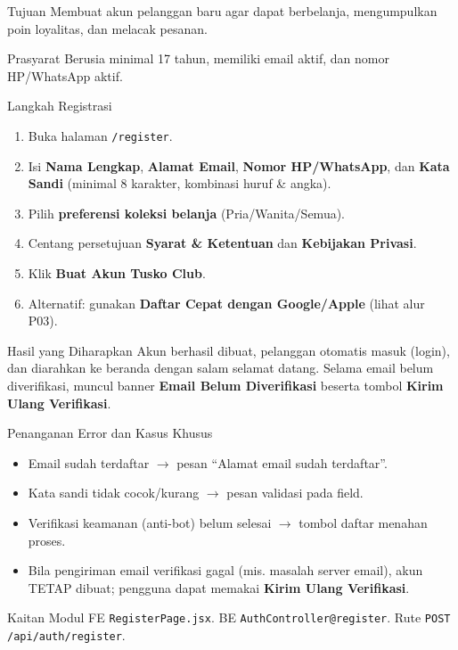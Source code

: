 
\begin{flowsection}{Tujuan}
Membuat akun pelanggan baru agar dapat berbelanja, mengumpulkan poin loyalitas,
dan melacak pesanan.
\end{flowsection}

\begin{flowsection}{Prasyarat}
Berusia minimal 17 tahun, memiliki email aktif, dan nomor HP/WhatsApp aktif.
\end{flowsection}

\begin{flowsection}{Langkah Registrasi}
\begin{enumerate}
  \item Buka halaman \texttt{/register}.
  \item Isi \textbf{Nama Lengkap}, \textbf{Alamat Email}, \textbf{Nomor HP/WhatsApp},
        dan \textbf{Kata Sandi} (minimal 8 karakter, kombinasi huruf \& angka).
  \item Pilih \textbf{preferensi koleksi belanja} (Pria/Wanita/Semua).
  \item Centang persetujuan \textbf{Syarat \& Ketentuan} dan \textbf{Kebijakan Privasi}.
  \item Klik \textbf{Buat Akun Tusko Club}.
  \item Alternatif: gunakan \textbf{Daftar Cepat dengan Google/Apple} (lihat alur P03).
\end{enumerate}
\end{flowsection}


\begin{flowsection}{Hasil yang Diharapkan}
Akun berhasil dibuat, pelanggan otomatis masuk (login), dan diarahkan ke beranda
dengan salam selamat datang. Selama email belum diverifikasi, muncul banner
\textbf{Email Belum Diverifikasi} beserta tombol \textbf{Kirim Ulang Verifikasi}.
\end{flowsection}


\begin{flowsection}{Penanganan Error dan Kasus Khusus}
\begin{itemize}
  \item Email sudah terdaftar $\rightarrow$ pesan ``Alamat email sudah terdaftar''.
  \item Kata sandi tidak cocok/kurang $\rightarrow$ pesan validasi pada field.
  \item Verifikasi keamanan (anti-bot) belum selesai $\rightarrow$ tombol daftar menahan proses.
  \item Bila pengiriman email verifikasi gagal (mis. masalah server email), akun
        TETAP dibuat; pengguna dapat memakai \textbf{Kirim Ulang Verifikasi}.
\end{itemize}
\end{flowsection}

\begin{flowsection}{Kaitan Modul}
FE \texttt{RegisterPage.jsx}. BE \texttt{AuthController@register}. Rute
\texttt{POST /api/auth/register}.
\end{flowsection}

